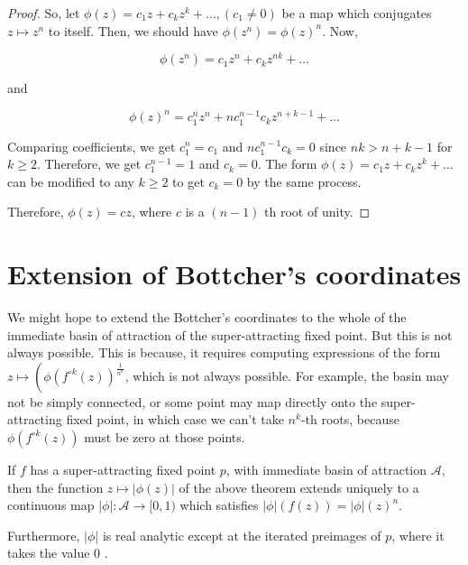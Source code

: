 \begin{proof}
So, let $\phi(z)=c_{1} z+c_{k} z^{k}+\ldots,\left(c_{1} \neq 0\right)$ be a map which conjugates $z \mapsto z^{n}$ to itself. Then, we should have $\phi\left(z^{n}\right)=\phi(z)^{n}$. Now,

$$
\phi\left(z^{n}\right)=c_{1} z^{n}+c_{k} z^{n k}+\ldots
$$

and

$$
\phi(z)^{n}=c_{1}^{n} z^{n}+n c_{1}^{n-1} c_{k} z^{n+k-1}+\ldots
$$

Comparing coefficients, we get $c_{1}^{n}=c_{1}$ and $n c_{1}^{n-1} c_{k}=0$ since $n k>n+k-1$ for $k \geq 2$. Therefore, we get $c_{1}^{n-1}=1$ and $c_{k}=0$. The form $\phi(z)=c_{1} z+c_{k} z^{k}+\ldots$ can be modified to any $k \geq 2$ to get $c_{k}=0$ by the same process.

Therefore, $\phi(z)=c z$, where $c$ is a $(n-1)$ th root of unity.

	
\end{proof}
\section{Extension of Bottcher's coordinates}
We might hope to extend the Bottcher's coordinates to the whole of the immediate basin of attraction of the super-attracting fixed point. But this is not always possible. This is because, it requires computing expressions of the form $z \mapsto\left(\phi\left(f^{\circ k}(z)\right)^{\frac{1}{n^{k}}}\right.$, which is not always possible. For example, the basin may not be simply connected, or some point may map directly onto the super-attracting fixed point, in which case we can't take $n^{k}$-th roots, because $\phi\left(f^{\circ k}(z)\right)$ must be zero at those points.

\begin{theorem}
If $f$ has a super-attracting fixed point $p$, with immediate basin of attraction $\mathcal{A}$, then the function $z \mapsto|\phi(z)|$ of the above theorem extends uniquely to a continuous map $|\phi|: \mathcal{A} \rightarrow[0,1)$ which satisfies $|\phi|(f(z))=|\phi|(z)^{n}$.

Furthermore, $|\phi|$ is real analytic except at the iterated preimages of $p$, where it takes the value 0 .
\end{theorem}

